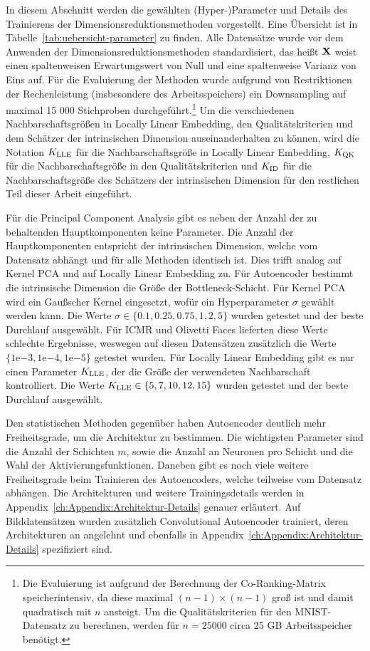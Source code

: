 In diesem Abschnitt werden die gewählten (Hyper-)Parameter und Details des Trainierens der
Dimensionsreduktionsmethoden vorgestellt. Eine Übersicht ist in
Tabelle~\ref{tab:uebersicht-parameter} zu finden. Alle Datensätze wurde vor dem Anwenden der
Dimensionsreduktionsmethoden standardisiert, das heißt $\mathbf{X}$ weist einen spaltenweisen
Erwartungswert von Null und eine spaltenweise Varianz von Eins auf. Für die Evaluierung der
Methoden wurde aufgrund von Restriktionen der Rechenleistung (insbesondere des Arbeitsspeichers)
ein Downsampling auf maximal 15 000 Stichproben durchgeführt.\footnote{Die Evaluierung ist aufgrund
	der Berechnung der Co-Ranking-Matrix speicherintensiv, da diese maximal $(n-1) \times (n-1)$ groß
	ist und damit quadratisch mit $n$ ansteigt. Um die Qualitätskriterien für den MNIST-Datensatz zu
	berechnen, werden für $n=25 000$ circa 25 GB Arbeitsspeicher benötigt.} Um die verschiedenen
Nachbarschaftsgrößen in Locally Linear Embedding, den Qualitätskriterien und dem Schätzer der
intrinsischen Dimension auseinanderhalten zu können, wird die Notation $K_{\text{LLE}}$ für die
Nachbarschaftsgröße in Locally Linear Embedding, $K_{\text{QK}}$ für die Nachbarschaftsgröße in den
Qualitätskriterien und $K_{\text{ID}}$ für die Nachbarschaftsgröße des Schätzers der intrinsischen Dimension
für den restlichen Teil dieser Arbeit eingeführt.

Für die Principal Component Analysis gibt es neben der Anzahl der zu behaltenden Hauptkomponenten
keine Parameter. Die Anzahl der Hauptkomponenten entspricht der intrinsischen Dimension, welche vom
Datensatz abhängt und für alle Methoden identisch ist. Dies trifft analog auf Kernel PCA und auf
Locally Linear Embedding zu. Für Autoencoder bestimmt die intrinsische Dimension die Größe der
Bottleneck-Schicht. Für Kernel PCA wird ein Gaußscher Kernel eingesetzt, wofür ein Hyperparameter
$\sigma$ gewählt werden kann. Die Werte $\sigma \in \{ 0.1, 0.25, 0.75, 1, 2, 5\}$ wurden getestet
und der beste Durchlauf ausgewählt. Für ICMR und Olivetti Faces lieferten diese Werte schlechte
Ergebnisse, weswegen auf diesen Datensätzen zusätzlich die Werte $\{ 1\mathrm{e}{-3},
	1\mathrm{e}{-4}, 1\mathrm{e}{-5}\}$ getestet wurden. Für Locally Linear Embedding gibt es nur einen
Parameter $K_{\text{LLE}}$, der die Größe der verwendeten Nachbarschaft kontrolliert. Die Werte $K_{\text{LLE}} \in
	\{ 5, 7, 10, 12, 15\}$ wurden getestet und der beste Durchlauf ausgewählt.

Den statistischen Methoden gegenüber haben Autoencoder deutlich mehr Freiheitsgrade, um die
Architektur zu bestimmen. Die wichtigsten Parameter sind die Anzahl der Schichten $m$, sowie die
Anzahl an Neuronen pro Schicht und die Wahl der Aktivierungsfunktionen. Daneben gibt es noch viele
weitere Freiheitsgrade beim Trainieren des Autoencoders, welche teilweise vom Datensatz abhängen.
Die Architekturen und weitere Trainingsdetails werden in
Appendix~\ref{ch:Appendix:Architektur-Details} genauer erläutert. Auf Bilddatensätzen wurden
zusätzlich Convolutional Autoencoder trainiert, deren Architekturen an \textcite[14]{Ghosh.2019}
angelehnt und ebenfalls in Appendix~\ref{ch:Appendix:Architektur-Details} spezifiziert sind.

